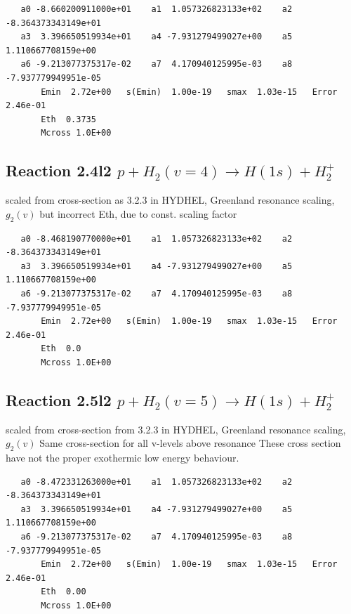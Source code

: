 \documentclass[12pt,dvipdfmx]{article}
\begin{document}
\begin{small}\begin{verbatim}
   a0 -8.660200911000e+01    a1  1.057326823133e+02    a2 -8.364373343149e+01
   a3  3.396650519934e+01    a4 -7.931279499027e+00    a5  1.110667708159e+00
   a6 -9.213077375317e-02    a7  4.170940125995e-03    a8 -7.937779949951e-05
       Emin  2.72e+00   s(Emin)  1.00e-19   smax  1.03e-15   Error  2.46e-01
       Eth  0.3735
       Mcross 1.0E+00
\end{verbatim}\end{small}


\subsection{
Reaction 2.4l2 $   p + H_2(v=4) \rightarrow H(1s) + H_2^+$}

scaled from cross-section as 3.2.3 in HYDHEL, Greenland resonance scaling, \cite{kn:Green} $g_2(v)$
but incorrect Eth, due to const. scaling factor

\begin{small}\begin{verbatim}
   a0 -8.468190770000e+01    a1  1.057326823133e+02    a2 -8.364373343149e+01
   a3  3.396650519934e+01    a4 -7.931279499027e+00    a5  1.110667708159e+00
   a6 -9.213077375317e-02    a7  4.170940125995e-03    a8 -7.937779949951e-05
       Emin  2.72e+00   s(Emin)  1.00e-19   smax  1.03e-15   Error  2.46e-01
       Eth  0.0
       Mcross 1.0E+00
\end{verbatim}\end{small}

\subsection{
Reaction 2.5l2 $   p + H_2(v=5) \rightarrow H(1s) + H_2^+$}

scaled from cross-section from 3.2.3 in HYDHEL,
Greenland resonance scaling, \cite{kn:Green} $g_2(v)$
Same cross-section for all v-levels above resonance
These cross section have not the proper exothermic low energy behaviour.

\begin{small}\begin{verbatim}
   a0 -8.472331263000e+01    a1  1.057326823133e+02    a2 -8.364373343149e+01
   a3  3.396650519934e+01    a4 -7.931279499027e+00    a5  1.110667708159e+00
   a6 -9.213077375317e-02    a7  4.170940125995e-03    a8 -7.937779949951e-05
       Emin  2.72e+00   s(Emin)  1.00e-19   smax  1.03e-15   Error  2.46e-01
       Eth  0.00
       Mcross 1.0E+00
\end{verbatim}\end{small}
\end{document}
